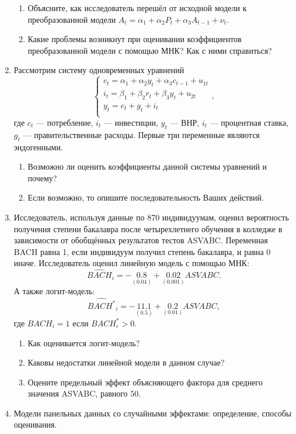 \documentclass[12pt, a4paper]{article}
\begin{document}
\begin{enumerate}
\begin{enumerate}
\item Объясните, как исследователь перешёл от исходной модели к преобразованной модели $A_t = \alpha_1 + \alpha_2 P_t + \alpha_3 A_{t-1} + \nu_t$.
\item Какие проблемы возникнут при оценивании коэффициентов преобразованной модели с помощью МНК? Как с ними справиться?
\end{enumerate}



\item Рассмотрим систему одновременных уравнений
\[
    \begin{cases}
    c_t = \alpha_1 + \alpha_2 y_t + \alpha_3 c_{t-1} + u_{1t} \\
    i_t = \beta_1 + \beta_2 r_t + \beta_3 y_t + u_{2t} \\
    y_t = c_t + g_t + i_t \\
    \end{cases},
\]
где  $c_t$ — потребление, $i_t$ — инвестиции, $y_t$ — ВНР, $i_t$ — процентная ставка, $g_t$ — правительственные расходы. Первые три переменные являются эндогенными.

\begin{enumerate}
\item Возможно ли оценить коэффициенты данной системы уравнений и почему?
\item Если возможно, то опишите последовательность Ваших действий.
\end{enumerate}



\item Исследователь, используя данные по 870 индивидуумам, оценил вероятность получения степени бакалавра после четырехлетнего обучения в колледже в зависимости от обобщённых результатов тестов ASVABC. Переменная BACH равна 1, если индивидуум получил степень бакалавра, и равна 0 иначе. Исследователь оценил линейную модель с помощью МНК:
\[
\widehat{BACH}_i = -\underset{(0.04)}{0.8} + \underset{(0.001)}{0.02}ASVABC.
\]
А также логит-модель:
\[
\widehat{BACH^*}_i =  -\underset{(0.5)}{11.1} + \underset{(0.01)}{0.2}ASVABC,
\]
где $BACH_i=1$ если $BACH^*_i > 0$.

\begin{enumerate}
\item Как оценивается логит-модель?
\item Каковы недостатки линейной модели в данном случае?
\item Оцените предельный эффект объясняющего фактора для среднего значения ASVABC, равного $50$.
\end{enumerate}


\item Модели панельных данных со случайными эффектами: определение, способы оценивания.

\end{enumerate}
\end{document}
